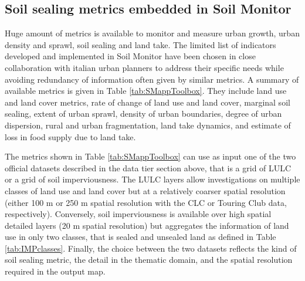 \documentclass[APA,LATO1COL,doublespace]{WileyNJD-v2}
\begin{document}
\subsection{Soil sealing metrics embedded in Soil Monitor } %
\label{sec:metrics}
Huge amount of metrics is available to monitor and measure urban growth, urban density and sprawl, soil sealing and land take.
The limited list of indicators developed and implemented in Soil Monitor have been chosen in close collaboration with italian urban planners to address their specific needs while avoiding redundancy of information often given by similar metrics. 
A summary of available metrics is given in Table \ref{tab:SMappToolbox}.
They include land use and land cover metrics, rate of change of land use and land cover, marginal soil sealing, extent of urban sprawl, density of urban boundaries, degree of urban dispersion, rural and urban fragmentation, land take dynamics, and estimate of loss in food supply due to land take. 

The metrics shown in Table \ref{tab:SMappToolbox} can use as input one of the two official datasets described in the data tier section above, that is a grid of LULC or a grid of soil imperviousness. 
The LULC layers allow investigations on multiple classes of land use and land cover but at a relatively coarser spatial resolution (either 100 m or 250 m spatial resolution with the CLC or Touring Club data, respectively).
Conversely, soil imperviousness is available over high spatial detailed layers (20 m spatial resolution) but aggregates the information of land use in only two classes, that is sealed and unsealed land as defined in Table \ref{tab:IMPclasses}. 
Finally, the choice between the two datasets reflects the kind of soil sealing metric, the detail in the thematic domain, and the spatial resolution required in the output map.
\end{document}
